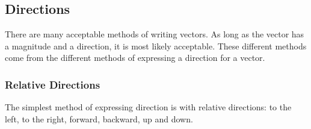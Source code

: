             \subsection{ Directions}
            \nopagebreak
      \label{m38812*id187219}There are many acceptable methods of writing vectors. As long as the vector has a magnitude and a direction, it is most likely acceptable. These different methods come from the different methods of expressing a direction for a vector.\par 
      \label{m38812*uid5}
            \subsubsection{ Relative Directions}
            \nopagebreak
        \label{m38812*id187233}The simplest method of expressing direction is with relative directions: to the left, to the right, forward, backward, up and down.\par 
      \label{m38812*uid6}
